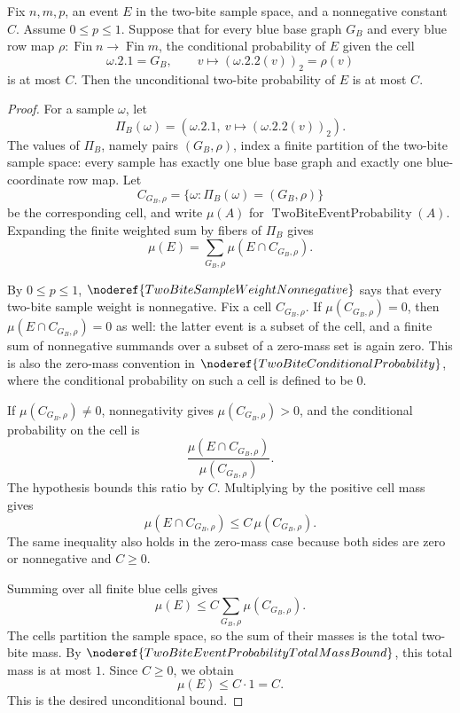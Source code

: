 \begin{lemma}
Fix \(n,m,p\), an event \(E\) in the two-bite sample space, and a
nonnegative constant \(C\).  Assume \(0\le p\le1\).  Suppose that for every
blue base graph \(G_B\) and every blue row map
\(\rho:\operatorname{Fin}n\to\operatorname{Fin}m\), the conditional
probability of \(E\) given the cell
\[
\omega.2.1=G_B,\qquad v\mapsto (\omega.2.2(v))_2=\rho(v)
\]
is at most \(C\).  Then the unconditional two-bite probability of \(E\) is
at most \(C\).
\end{lemma}
\begin{proof}
For a sample \(\omega\), let
\[
\Pi_B(\omega)=\left(\omega.2.1,\ v\mapsto(\omega.2.2(v))_2\right).
\]
The values of \(\Pi_B\), namely pairs \((G_B,\rho)\), index a finite
partition of the two-bite sample space: every sample has exactly one blue
base graph and exactly one blue-coordinate row map.  Let
\[
C_{G_B,\rho}=\{\omega:\Pi_B(\omega)=(G_B,\rho)\}
\]
be the corresponding cell, and write \(\mu(A)\) for
\(\operatorname{TwoBiteEventProbability}(A)\).  Expanding the finite weighted
sum by fibers of \(\Pi_B\) gives
\[
\mu(E)=\sum_{G_B,\rho}\mu(E\cap C_{G_B,\rho}).
\]

By \(0\le p\le1\), \(\noderef{TwoBiteSampleWeightNonnegative}\) says that
every two-bite sample weight is nonnegative.  Fix a cell
\(C_{G_B,\rho}\).  If \(\mu(C_{G_B,\rho})=0\), then
\(\mu(E\cap C_{G_B,\rho})=0\) as well: the latter event is a subset of the
cell, and a finite sum of nonnegative summands over a subset of a zero-mass
set is again zero.  This is also the zero-mass convention in
\(\noderef{TwoBiteConditionalProbability}\), where the conditional
probability on such a cell is defined to be \(0\).

If \(\mu(C_{G_B,\rho})\ne0\), nonnegativity gives
\(\mu(C_{G_B,\rho})>0\), and the conditional probability on the cell is
\[
\frac{\mu(E\cap C_{G_B,\rho})}{\mu(C_{G_B,\rho})}.
\]
The hypothesis bounds this ratio by \(C\).  Multiplying by the positive cell
mass gives
\[
\mu(E\cap C_{G_B,\rho})\le C\,\mu(C_{G_B,\rho}).
\]
The same inequality also holds in the zero-mass case because both sides are
zero or nonnegative and \(C\ge0\).

Summing over all finite blue cells gives
\[
\mu(E)
\le C\sum_{G_B,\rho}\mu(C_{G_B,\rho}).
\]
The cells partition the sample space, so the sum of their masses is the total
two-bite mass.  By \(\noderef{TwoBiteEventProbabilityTotalMassBound}\), this
total mass is at most \(1\).  Since \(C\ge0\), we obtain
\[
\mu(E)\le C\cdot 1=C.
\]
This is the desired unconditional bound.
\end{proof}
